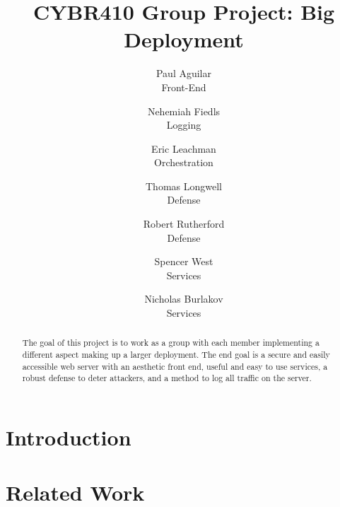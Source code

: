 \documentclass[letterpaper,twocolumn,10pt]{article}
\begin{document}

\date{}

\title{\Large \bf CYBR410 Group Project: Big Deployment}

\author{
  {\rm Paul Aguilar}\\
  Front-End
  \and
  {\rm Nehemiah Fiedls}\\
  Logging
  \and
  {\rm Eric Leachman}\\
  Orchestration
  \and
  {\rm Thomas Longwell}\\
  Defense
  \and
  {\rm Robert Rutherford}\\
  Defense
  \and
  {\rm Spencer West}\\
  Services
  \and
  {\rm Nicholas Burlakov}\\
  Services
}

\maketitle

\begin{abstract}
The goal of this project is to work as a group with each member implementing a different aspect making up a larger deployment. The end goal is a secure and easily accessible web server with an aesthetic front end, useful and easy to use services, a robust defense to deter attackers,  and a method to log all traffic on the server. 
\end{abstract}


\section{Introduction}


\section{Related Work}

\end{document}
